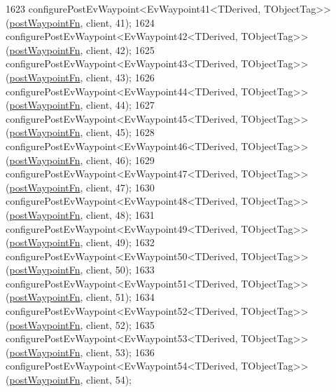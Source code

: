 \begin{DoxyCode}
1623     configurePostEvWaypoint<EvWaypoint41<TDerived, TObjectTag>>(\hyperlink{classmove__base__z__client_1_1WaypointEventDispatcher_acc538eb7506c13f7cca2268a1742dadd}{postWaypointFn}, client, 41);
1624     configurePostEvWaypoint<EvWaypoint42<TDerived, TObjectTag>>(\hyperlink{classmove__base__z__client_1_1WaypointEventDispatcher_acc538eb7506c13f7cca2268a1742dadd}{postWaypointFn}, client, 42);
1625     configurePostEvWaypoint<EvWaypoint43<TDerived, TObjectTag>>(\hyperlink{classmove__base__z__client_1_1WaypointEventDispatcher_acc538eb7506c13f7cca2268a1742dadd}{postWaypointFn}, client, 43);
1626     configurePostEvWaypoint<EvWaypoint44<TDerived, TObjectTag>>(\hyperlink{classmove__base__z__client_1_1WaypointEventDispatcher_acc538eb7506c13f7cca2268a1742dadd}{postWaypointFn}, client, 44);
1627     configurePostEvWaypoint<EvWaypoint45<TDerived, TObjectTag>>(\hyperlink{classmove__base__z__client_1_1WaypointEventDispatcher_acc538eb7506c13f7cca2268a1742dadd}{postWaypointFn}, client, 45);
1628     configurePostEvWaypoint<EvWaypoint46<TDerived, TObjectTag>>(\hyperlink{classmove__base__z__client_1_1WaypointEventDispatcher_acc538eb7506c13f7cca2268a1742dadd}{postWaypointFn}, client, 46);
1629     configurePostEvWaypoint<EvWaypoint47<TDerived, TObjectTag>>(\hyperlink{classmove__base__z__client_1_1WaypointEventDispatcher_acc538eb7506c13f7cca2268a1742dadd}{postWaypointFn}, client, 47);
1630     configurePostEvWaypoint<EvWaypoint48<TDerived, TObjectTag>>(\hyperlink{classmove__base__z__client_1_1WaypointEventDispatcher_acc538eb7506c13f7cca2268a1742dadd}{postWaypointFn}, client, 48);
1631     configurePostEvWaypoint<EvWaypoint49<TDerived, TObjectTag>>(\hyperlink{classmove__base__z__client_1_1WaypointEventDispatcher_acc538eb7506c13f7cca2268a1742dadd}{postWaypointFn}, client, 49);
1632     configurePostEvWaypoint<EvWaypoint50<TDerived, TObjectTag>>(\hyperlink{classmove__base__z__client_1_1WaypointEventDispatcher_acc538eb7506c13f7cca2268a1742dadd}{postWaypointFn}, client, 50);
1633     configurePostEvWaypoint<EvWaypoint51<TDerived, TObjectTag>>(\hyperlink{classmove__base__z__client_1_1WaypointEventDispatcher_acc538eb7506c13f7cca2268a1742dadd}{postWaypointFn}, client, 51);
1634     configurePostEvWaypoint<EvWaypoint52<TDerived, TObjectTag>>(\hyperlink{classmove__base__z__client_1_1WaypointEventDispatcher_acc538eb7506c13f7cca2268a1742dadd}{postWaypointFn}, client, 52);
1635     configurePostEvWaypoint<EvWaypoint53<TDerived, TObjectTag>>(\hyperlink{classmove__base__z__client_1_1WaypointEventDispatcher_acc538eb7506c13f7cca2268a1742dadd}{postWaypointFn}, client, 53);
1636     configurePostEvWaypoint<EvWaypoint54<TDerived, TObjectTag>>(\hyperlink{classmove__base__z__client_1_1WaypointEventDispatcher_acc538eb7506c13f7cca2268a1742dadd}{postWaypointFn}, client, 54);

\end{DoxyCode}
